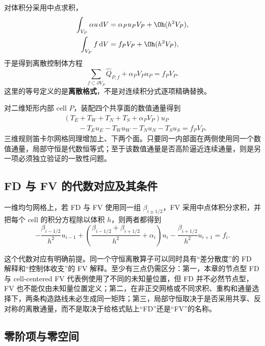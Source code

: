 对体积分采用中点求积，
\begin{align}
\int_{V_P}\alpha u\,\mathrm dV
&=\alpha_Pu_PV_P+\Oh(h^2V_P),\\
\int_{V_P}f\,\mathrm dV
&=f_PV_P+\Oh(h^2V_P),
\end{align}
于是得到离散控制体方程
\begin{equation}
\sum_{f\subset\partial V_P}\widehat Q_{P,f}
+\alpha_PV_Pu_P
=f_PV_P.
\label{eq:discretization-fv-balance-general}
\end{equation}
这里的等号定义的是\textbf{离散格式}，不是对连续积分式逐项精确替换。

对二维矩形内部 cell $P$，装配四个共享面的数值通量得到
\begin{equation}
\boxed{
\begin{aligned}
&\left(T_E+T_W+T_N+T_S+\alpha_PV_P\right)u_P\\
&\qquad -T_Eu_E-T_Wu_W-T_Nu_N-T_Su_S
=f_PV_P.
\end{aligned}
}
\label{eq:discretization-two-dimensional-flux-row}
\end{equation}
三维规则笛卡尔网格同理增加上、下两个面。只要同一内部面在两侧使用同一个数值通量，局部守恒是代数恒等式；至于该数值通量是否高阶逼近连续通量，则是另一项必须独立验证的一致性问题。

\subsection{FD 与 FV 的代数对应及其条件}

一维均匀网格上，若 FD 与 FV 使用同一组 $\beta_{i\pm1/2}$，FV 采用中点体积分求积，并把每个 cell 的积分方程除以体积 $h$，则两者都得到
\begin{equation}
-\frac{\beta_{i-1/2}}{h^2}u_{i-1}
+\left(
\frac{\beta_{i-1/2}+\beta_{i+1/2}}{h^2}
+\alpha_i
\right)u_i
-\frac{\beta_{i+1/2}}{h^2}u_{i+1}
=f_i.
\end{equation}

这个代数对应有明确前提。同一个守恒离散算子可以同时具有“差分散度”的 FD 解释和“控制体收支”的 FV 解释。至少有三点仍需区分：第一，本章的节点型 FD 与 cell-centered FV 代表例使用了不同的未知量位置，但 FD 并不必然节点型，FV 也不能仅由未知量位置定义；第二，在非正交网格或不同求积、重构和通量选择下，两条构造路线未必生成同一矩阵；第三，局部守恒取决于是否采用共享、反对称的离散通量，而不是取决于给格式贴上“FD”还是“FV”的名称。

\subsection{零阶项与零空间}

